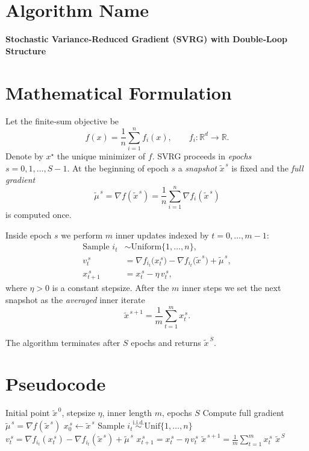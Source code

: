 \documentclass{article}
\begin{document}
\section*{Algorithm Name}
\textbf{Stochastic Variance‑Reduced Gradient (SVRG) with Double‑Loop Structure}

\section*{Mathematical Formulation}
Let the finite‑sum objective be 
\[
f(x)=\frac{1}{n}\sum_{i=1}^{n} f_i(x),\qquad f_i:\mathbb{R}^d\to\mathbb{R}.
\]
Denote by $x^\star$ the unique minimizer of $f$.  
SVRG proceeds in \emph{epochs} $s=0,1,\dots,S-1$.  
At the beginning of epoch $s$ a \emph{snapshot} $\tilde x^{\,s}$ is fixed and the \emph{full gradient}
\[
\tilde \mu^{\,s}= \nabla f(\tilde x^{\,s})=\frac{1}{n}\sum_{i=1}^{n}\nabla f_i(\tilde x^{\,s})
\tag{1}
\]
is computed once.

Inside epoch $s$ we perform $m$ inner updates indexed by $t=0,\dots,m-1$:
\[
\begin{aligned}
\text{Sample } i_t &\sim \text{Uniform}\{1,\dots,n\},\\[0.2em]
v_t^{\,s} &= \nabla f_{i_t}\bigl(x_t^{\,s}\bigr)-\nabla f_{i_t}\bigl(\tilde x^{\,s}\bigr)+\tilde\mu^{\,s},\\[0.2em]
x_{t+1}^{\,s} &= x_t^{\,s}-\eta\, v_t^{\,s},
\end{aligned}
\tag{2}
\]
where $\eta>0$ is a constant stepsize.  
After the $m$ inner steps we set the next snapshot as the \emph{averaged} inner iterate
\[
\tilde x^{\,s+1}= \frac{1}{m}\sum_{t=1}^{m} x_t^{\,s}.
\tag{3}
\]

The algorithm terminates after $S$ epochs and returns $\tilde x^{\,S}$.

\section*{Pseudocode}
\begin{algorithm}[H]
\caption{SVRG (double‑loop)}\label{alg:svrg}
\begin{algorithmic}[1]
\Require Initial point $\tilde x^{\,0}$, stepsize $\eta$, inner length $m$, epochs $S$
    \State Compute full gradient $\tilde\mu^{\,s}= \nabla f(\tilde x^{\,s})$ 
    \State $x_0^{\,s}\gets \tilde x^{\,s}$
        \State Sample $i_t\stackrel{\text{i.i.d.}}{\sim}\text{Unif}\{1,\dots,n\}$
        \State $v_t^{\,s}= \nabla f_{i_t}(x_t^{\,s})-\nabla f_{i_t}(\tilde x^{\,s})+\tilde\mu^{\,s}$ 
        \State $x_{t+1}^{\,s}= x_t^{\,s}-\eta\,v_t^{\,s}$ 
    \EndFor
    \State $\tilde x^{\,s+1}= \frac{1}{m}\sum_{t=1}^{m} x_t^{\,s}$ 
\EndFor
\State \Return $\tilde x^{\,S}$
\end{algorithmic}
\end{algorithm}
\end{document}
